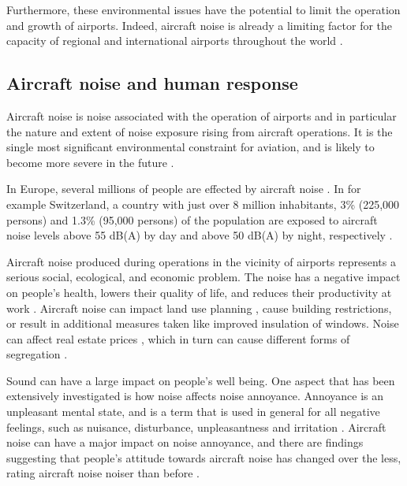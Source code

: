Furthermore, these environmental issues have the potential to limit the
operation and growth of airports. Indeed, aircraft noise is already a limiting
factor for the capacity of regional and international airports throughout the
world \cite{Zaporozhets2011}.


\subsection{Aircraft noise and human response}
Aircraft noise is noise associated with the operation of airports and in
particular the nature and extent of noise exposure rising from aircraft
operations. It is the single most significant
environmental constraint for aviation, and is likely to become more severe in the future
\cite{Zaporozhets2011}. 

In Europe, several millions of people are effected by aircraft noise
\cite{MPDGroupLimited2007}. In for example Switzerland, a country with just over
8 million inhabitants, 3\% (225,000 persons) and 1.3\% (95,000 persons) of the
population are exposed to aircraft noise levels above 55 dB(A) by day and above
50 dB(A) by night, respectively \cite{Kirk2009,Schaffer2014}. 

Aircraft noise produced during operations in the vicinity of airports represents
a serious social, ecological, and economic problem. The noise has a negative
impact on people's health, lowers their quality of life, and reduces their
productivity at work \cite{Zaporozhets2011}. Aircraft noise can impact land use
planning \cite{Freestone2010}, cause building restrictions, or result
in additional measures taken like improved insulation of windows. Noise can
affect real estate prices \cite{Theebe2004}, which in turn can cause different
forms of segregation \cite{Bjornskau2005}.

Sound can have a large impact on people's well being. One aspect that has been
extensively investigated is how noise affects noise annoyance. Annoyance is an
unpleasant mental state, and is a term that is used in general for all negative
feelings, such as nuisance, disturbance, unpleasantness and irritation
\cite{Guski1999}. Aircraft noise can have a major impact on noise annoyance,
and there are findings suggesting that people's attitude towards aircraft noise
has changed over the less, rating aircraft noise noiser than before \cite{Babisch2009}.

